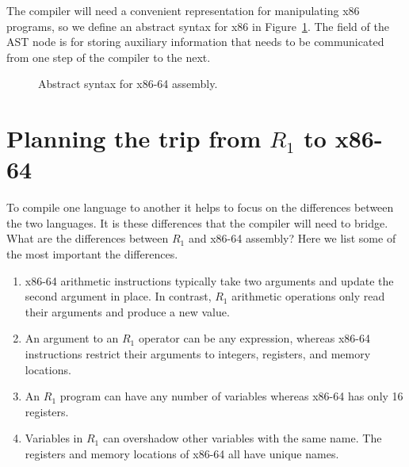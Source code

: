 \documentclass[11pt]{book}
\begin{document}
The compiler will need a convenient representation for manipulating
x86 programs, so we define an abstract syntax for x86 in
Figure~\ref{fig:x86-ast-a}. The  field of the 
AST node is for storing auxiliary information that needs to be
communicated from one step of the compiler to the next. 

\begin{figure}[tbp]
\caption{Abstract syntax for x86-64 assembly.}
\label{fig:x86-ast-a}
\end{figure}

\section{Planning the trip from $R_1$ to x86-64}
\label{sec:plan-s0-x86}

To compile one language to another it helps to focus on the
differences between the two languages. It is these differences that
the compiler will need to bridge. What are the differences between
$R_1$ and x86-64 assembly? Here we list some of the most important the
differences.

\begin{enumerate}
\item x86-64 arithmetic instructions typically take two arguments and
  update the second argument in place. In contrast, $R_1$ arithmetic
  operations only read their arguments and produce a new value.

\item An argument to an $R_1$ operator can be any expression, whereas
  x86-64 instructions restrict their arguments to integers, registers,
  and memory locations.

\item An $R_1$ program can have any number of variables whereas x86-64
  has only 16 registers.

\item Variables in $R_1$ can overshadow other variables with the same
  name. The registers and memory locations of x86-64 all have unique
  names.
\end{enumerate}
\end{document}
